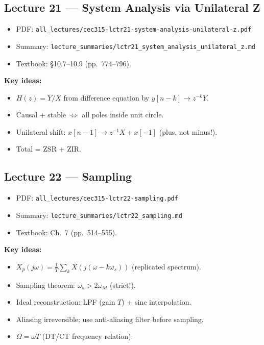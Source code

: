 \documentclass[11pt]{article}
\begin{document}
\subsection{Lecture 21 --- System Analysis via Unilateral Z}
\begin{itemize}[leftmargin=*]
  \item PDF: \texttt{all\_lectures/cec315-lctr21-system-analysis-unilateral-z.pdf}
  \item Summary: \texttt{lecture\_summaries/lctr21\_system\_analysis\_unilateral\_z.md}
  \item Textbook: \S 10.7--10.9 (pp.~774--796).
\end{itemize}
\textbf{Key ideas:}
\begin{itemize}[leftmargin=*]
  \item $H(z) = Y/X$ from difference equation by $y[n-k]\to z^{-k}Y$.
  \item Causal + stable $\Leftrightarrow$ all poles inside unit circle.
  \item Unilateral shift: $x[n-1] \to z^{-1}X + x[-1]$ (plus, not minus!).
  \item Total = ZSR + ZIR.
\end{itemize}

\subsection{Lecture 22 --- Sampling}
\begin{itemize}[leftmargin=*]
  \item PDF: \texttt{all\_lectures/cec315-lctr22-sampling.pdf}
  \item Summary: \texttt{lecture\_summaries/lctr22\_sampling.md}
  \item Textbook: Ch.~7 (pp.~514--555).
\end{itemize}
\textbf{Key ideas:}
\begin{itemize}[leftmargin=*]
  \item $X_p(j\omega) = \frac{1}{T}\sum_k X(j(\omega - k\omega_s))$ (replicated spectrum).
  \item Sampling theorem: $\omega_s > 2\omega_M$ (strict!).
  \item Ideal reconstruction: LPF (gain $T$) + sinc interpolation.
  \item Aliasing irreversible; use anti-aliasing filter before sampling.
  \item $\Omega = \omega T$ (DT/CT frequency relation).
\end{itemize}
\end{document}
